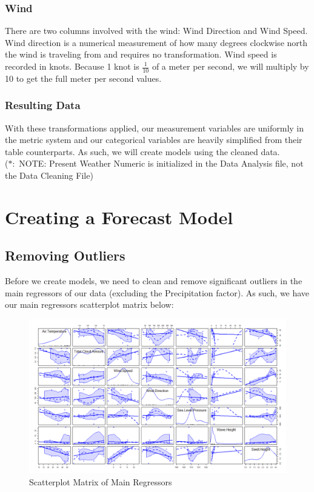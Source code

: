 \documentclass{article}
\begin{document}
\subsubsection*{Wind}

There are two columns involved with the wind: Wind Direction and Wind Speed. Wind direction is a numerical measurement of how many degrees clockwise north the wind is traveling from and requires no transformation. Wind speed is recorded in knots. Because 1 knot is $\frac{1}{10}$ of a meter per second, we will multiply by 10 to get the full meter per second values.

\subsubsection*{Resulting Data}

With these transformations applied, our measurement variables are uniformly in the metric system and our categorical variables are heavily simplified from their table counterparts. As such, we will create models using the cleaned data. 
\\
($*:$ NOTE: Present Weather Numeric is initialized in the Data Analysis file, not the Data Cleaning File)

\section{Creating a Forecast Model}

\subsection{Removing Outliers}

Before we create models, we need to clean and remove significant outliers in the main regressors of our data (excluding the Precipitation factor). As such, we have our main regressors scatterplot matrix below:

\newpage

\begin{figure}[h]
    \centering
    \includegraphics[scale = 0.25]{volume/forecastVarsUnfix.png}
    \caption{Scatterplot Matrix of Main Regressors}
    \label{fig:SPMUnifx}
\end{figure}
\end{document}
